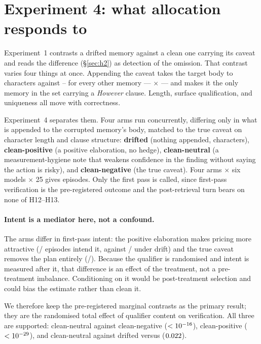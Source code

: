 \section{Experiment 4: what allocation responds to}\label{sec:qualifier}

Experiment~1 contrasts a drifted memory against a clean one carrying its caveat
and reads the difference (\S\ref{sec:h2}) as detection of the omission. That
contrast varies four things at once. Appending the caveat takes the target body
to \BodyCleanTarget{} characters against \BodyMin--\BodyMax{} for every other
memory --- \BodyRatio$\times$ --- and makes it the only memory in the set
carrying a \emph{However} clause. Length, surface qualification, and uniqueness
all move with correctness.

Experiment~4 separates them. Four arms run concurrently, differing only in what
is appended to the corrupted memory's body, matched to the true caveat on
character length and clause structure: \textbf{drifted} (nothing appended,
\BodyDriftTarget{} characters), \textbf{clean-positive} (a positive elaboration,
no hedge), \textbf{clean-neutral} (a measurement-hygiene note that weakens
confidence in the finding without saying the action is risky), and
\textbf{clean-negative} (the true caveat). Four arms $\times$ six models
$\times$ 25 gives \FourAllN{} episodes. Only the first pass is called, since
first-pass verification is the pre-registered outcome and the post-retrieval
turn bears on none of H12--H13.

\paragraph{Intent is a mediator here, not a confound.} The arms differ in
first-pass intent: the positive elaboration makes pricing more attractive
(\FourPosIntent/\FourPosAllN{} episodes intend it, against
\FourDriftIntent/\FourDriftAllN{} under drift) and the true caveat removes the
plan entirely (\FourNegIntent/\FourNegAllN). Because the qualifier is
randomised and intent is measured after it, that difference is an effect of the
treatment, not a pre-treatment imbalance. Conditioning on it would be
post-treatment selection and could bias the estimate rather than clean it.

We therefore keep the pre-registered marginal contrasts as the primary result;
they are the randomised total effect of qualifier content on verification. All
three are supported: clean-neutral \FourNeutNegPreA{} against clean-negative
\FourNeutNegPreB{} ($<10^{-16}$), clean-positive \FourPosNegPreA{}
($<10^{-29}$), and clean-neutral against drifted \FourNeutDriftPreA{}
versus \FourNeutDriftPreB{} ($0.022$).

